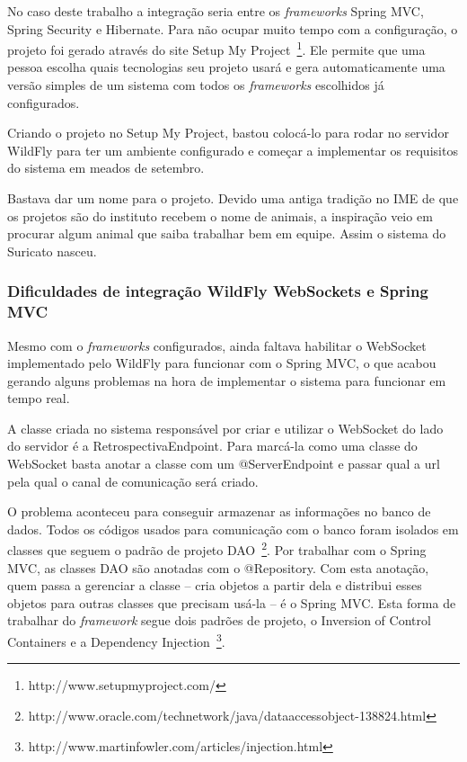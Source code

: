 No caso deste trabalho a integração seria entre os \textit{frameworks} Spring MVC, Spring Security e Hibernate. Para não ocupar muito tempo com a configuração, o projeto foi gerado através do site Setup My Project~\footnote{http://www.setupmyproject.com/}. Ele permite que uma pessoa escolha quais tecnologias seu projeto usará e gera automaticamente uma versão simples de um sistema com todos os \textit{frameworks} escolhidos já configurados.

Criando o projeto no Setup My Project, bastou colocá-lo para rodar no servidor WildFly para ter um ambiente configurado e começar a implementar os requisitos do sistema em meados de setembro.

Bastava dar um nome para o projeto. Devido uma antiga tradição no IME de que os projetos são do instituto recebem o nome de animais, a inspiração veio em procurar algum animal que saiba trabalhar bem em equipe. Assim o sistema do Suricato nasceu.

\subsubsection*{Dificuldades de integração WildFly WebSockets e Spring MVC}

Mesmo com o \textit{frameworks} configurados, ainda faltava habilitar o WebSocket implementado pelo WildFly para funcionar com o Spring MVC, o que acabou gerando alguns problemas na hora de implementar o sistema para funcionar em tempo real.

A classe criada no sistema responsável por criar e utilizar o WebSocket do lado do servidor é a RetrospectivaEndpoint. Para marcá-la como uma classe do WebSocket basta anotar a classe com um @ServerEndpoint e passar qual a url pela qual o canal de comunicação será criado.

O problema aconteceu para conseguir armazenar as informações no banco de dados. Todos os códigos usados para comunicação com o banco foram isolados em classes que seguem o padrão de projeto DAO~\footnote{http://www.oracle.com/technetwork/java/dataaccessobject-138824.html}. Por trabalhar com o Spring MVC, as classes DAO são anotadas com o @Repository. Com esta anotação, quem passa a gerenciar a classe -- cria objetos a partir dela e distribui esses objetos para outras classes que precisam usá-la -- é o Spring MVC. Esta forma de trabalhar do \textit{framework} segue dois padrões de projeto, o Inversion of Control Containers e a Dependency Injection~\footnote{http://www.martinfowler.com/articles/injection.html}.

